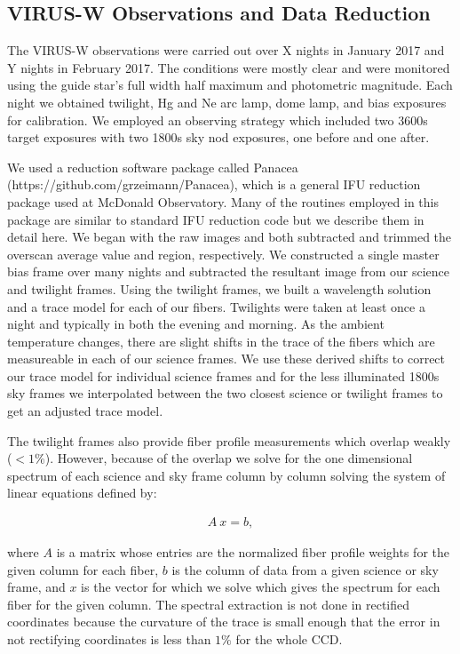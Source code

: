 \documentclass[%
 aip,
 twocolumn,
 jmp,%
 amsmath,amssymb,
 reprint,%
]{aastex61}
\begin{document}
\subsection{VIRUS-W Observations and Data Reduction}


The VIRUS-W observations were carried out over X nights in January 2017 and Y nights in February 2017.  The conditions were mostly clear and were monitored using the guide star’s full width half maximum and photometric magnitude.  Each night we obtained twilight, Hg and Ne arc lamp, dome lamp, and bias exposures for calibration.  We employed an observing strategy which included two 3600s target exposures with two 1800s sky nod exposures, one before and one after.


We used a reduction software package called Panacea (https://github.com/grzeimann/Panacea), which is a general IFU reduction package used at McDonald Observatory.  Many of the routines employed in this package are similar to standard IFU reduction code but we describe them in detail here.  We began with the raw images and both subtracted and trimmed the overscan average value and region, respectively.  We constructed a single master bias frame over many nights and subtracted the resultant image from our science and twilight frames.  Using the twilight frames, we built a wavelength solution and a trace model for each of our fibers.  Twilights were taken at least once a night and typically in both the evening and morning.  As the ambient temperature changes, there are slight shifts in the trace of the fibers which are measureable in each of our science frames.  We use these derived shifts to correct our trace model for individual science frames and for the less illuminated 1800s sky frames we interpolated between the two closest science or twilight frames to get an adjusted trace model.  


The twilight frames also provide fiber profile measurements which overlap weakly ($<1\%$).  However, because of the overlap we solve for the one dimensional spectrum of each science and sky frame column by column solving the system of linear equations defined by:

\begin{align}

A\ x = b,

\end{align}

where $A$ is a matrix whose entries are the normalized fiber profile weights for the given column for each fiber, $b$ is the column of data from a given science or sky frame, and $x$ is the vector for which we solve which gives the spectrum for each fiber for the given column.  The spectral extraction is not done in rectified coordinates because the curvature of the trace is small enough that the error in not rectifying coordinates is less than $1\%$ for the whole CCD.
\end{document}
